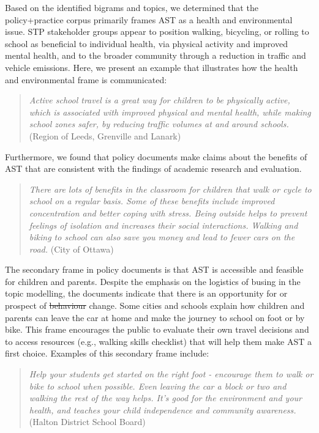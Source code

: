 \documentclass[preprint, 3p,
authoryear]{elsarticle} %
\providecommand{\DIFaddtex}[1]{{\protect\color{blue}\uwave{#1}}} %
\providecommand{\DIFdeltex}[1]{{\protect\color{red}\sout{#1}}}                      %
\providecommand{\DIFaddbegin}{} %
\providecommand{\DIFaddend}{} %
\providecommand{\DIFdelbegin}{} %
\providecommand{\DIFdelend}{} %
\providecommand{\DIFadd}[1]{\texorpdfstring{\DIFaddtex{#1}}{#1}} %
\providecommand{\DIFdel}[1]{\texorpdfstring{\DIFdeltex{#1}}{}} %
\newcommand{\DIFscaledelfig}{0.5}
\newlength{\DIFdelgraphicswidth} %
\newlength{\DIFdelgraphicsheight} %
\newcommand{\DIFaddincludegraphics}[2][]{{\color{blue}\fbox{\DIFOincludegraphics[#1]{#2}}}} %
\newcommand{\DIFdelincludegraphics}[2][]{%
\sbox{\DIFdelgraphicsbox}{\DIFOincludegraphics[#1]{#2}}%
\settoboxwidth{\DIFdelgraphicswidth}{\DIFdelgraphicsbox} %
\settoboxtotalheight{\DIFdelgraphicsheight}{\DIFdelgraphicsbox} %
\scalebox{\DIFscaledelfig}{%
\parbox[b]{\DIFdelgraphicswidth}{\usebox{\DIFdelgraphicsbox}\\[-\baselineskip] \rule{\DIFdelgraphicswidth}{0em}}\llap{\resizebox{\DIFdelgraphicswidth}{\DIFdelgraphicsheight}{%
\setlength{\unitlength}{\DIFdelgraphicswidth}%
\begin{picture}(1,1)%
\thicklines\linethickness{2pt} %
{\color[rgb]{1,0,0}\put(0,0){\framebox(1,1){}}}%
{\color[rgb]{1,0,0}\put(0,0){\line( 1,1){1}}}%
{\color[rgb]{1,0,0}\put(0,1){\line(1,-1){1}}}%
\end{picture}%
}\hspace*{3pt}}} %
} %
\DeclareRobustCommand{\DIFaddbegin}{\DIFOaddbegin \let\includegraphics\DIFaddincludegraphics} %
\DeclareRobustCommand{\DIFaddend}{\DIFOaddend \let\includegraphics\DIFOincludegraphics} %
\DeclareRobustCommand{\DIFdelbegin}{\DIFOdelbegin \let\includegraphics\DIFdelincludegraphics} %
\DeclareRobustCommand{\DIFdelend}{\DIFOaddend \let\includegraphics\DIFOincludegraphics} %
\begin{document}
Based on the identified bigrams and topics, we determined that the
policy+practice corpus primarily frames AST as a health and
environmental issue. STP stakeholder groups appear to position walking,
bicycling, or rolling to school as beneficial to individual health, via
physical activity and improved mental health, and to the broader
community through a reduction in traffic and vehicle emissions. Here, we
present an example that illustrates how the health and environmental
frame is communicated:

\begin{quote}
\emph{Active school travel is a great way for children to be physically
active, which is associated with improved physical and mental health,
while making school zones safer, by reducing traffic volumes at and
around schools.}(Region of Leeds, Grenville and Lanark)
\end{quote}

Furthermore, we found that policy documents make claims about the
benefits of AST that are consistent with the findings of academic
research and evaluation.

\begin{quote}
\emph{There are lots of benefits in the classroom for children that walk
or cycle to school on a regular basis. Some of these benefits include
improved concentration and better coping with stress. Being outside
helps to prevent feelings of isolation and increases their social
interactions. Walking and biking to school can also save you money and
lead to fewer cars on the road.} (City of Ottawa)
\end{quote}

The secondary frame in policy documents is that AST is accessible and
feasible for children and parents. Despite the emphasis on the logistics
of busing in the topic modelling, the documents indicate that there is
an opportunity for or prospect of \DIFdelbegin \DIFdel{behaviour }\DIFdelend \DIFaddbegin \DIFadd{behavior }\DIFaddend change. Some cities and
schools explain how children and parents can leave the car at home and
make the journey to school on foot or by bike. This frame encourages the
public to evaluate their own travel decisions and to access resources
(e.g., walking skills checklist) that will help them make AST a first
choice. Examples of this secondary frame include:

\begin{quote}
\emph{Help your students get started on the right foot - encourage them
to walk or bike to school when possible. Even leaving the car a block or
two and walking the rest of the way helps. It's good for the environment
and your health, and teaches your child independence and community
awareness.} (Halton District School Board)
\end{quote}
\end{document}
